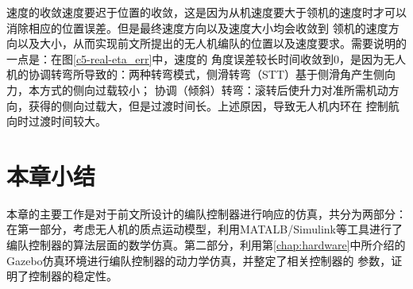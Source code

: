 速度的收敛速度要迟于位置的收敛，这是因为从机速度要大于领机的速度时才可以消除相应的位置误差。但是最终速度方向以及速度大小均会收敛到
领机的速度方向以及大小，从而实现前文所提出的无人机编队的位置以及速度要求。需要说明的一点是：在图\ref{c5-real-eta_err}中，速度的
角度误差较长时间收敛到0，是因为无人机的协调转弯所导致的：两种转弯模式，侧滑转弯（STT）基于侧滑角产生侧向力，本方式的侧向过载较小；
协调（倾斜）转弯：滚转后使升力对准所需机动方向，获得的侧向过载大，但是过渡时间长。\cite{YuJianQiao2010}上述原因，导致无人机内环在
控制航向时过渡时间较大。
\section{本章小结}
本章的主要工作是对于前文所设计的编队控制器进行响应的仿真，共分为两部分：在第一部分，考虑无人机的质点运动模型，利用MATALB/Simulink等工具进行了
编队控制器的算法层面的数学仿真。第二部分，利用第\ref{chap:hardware}中所介绍的Gazebo仿真环境进行编队控制器的动力学仿真，并整定了相关控制器的
参数，证明了控制器的稳定性。
